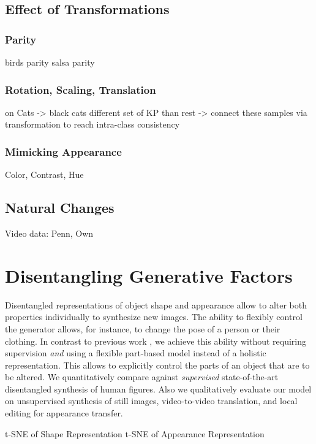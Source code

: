 	\subsection{Effect of Transformations}
		\subsubsection{Parity}
		birds parity
		salsa parity
		\subsubsection{Rotation, Scaling, Translation}
			on Cats -> black cats different set of KP than rest -> connect these samples via transformation to reach intra-class consistency
		\subsubsection{Mimicking Appearance}
		Color, Contrast, Hue
		\subsection{Natural Changes}
		Video data: Penn, Own
\section{Disentangling Generative Factors}
	Disentangled representations of object shape and appearance allow to alter both properties individually to synthesize new images. The ability to flexibly control the generator allows, for instance, to change the pose of a person or their clothing. In contrast to previous work \cite{Esser:2018ue, Denton:2017uf, Ma:2017uu, Ma:2017wq, deBem:2018wp, Jakab:2018wc},
	we achieve this ability without requiring supervision \textit{and} using a flexible part-based model instead of a holistic representation. This allows to explicitly control the parts of an object that are to be altered. We quantitatively compare against \emph{supervised} state-of-the-art disentangled synthesis of human figures. Also we qualitatively evaluate our model on unsupervised synthesis of still images, video-to-video translation, and local editing for appearance transfer.


	t-SNE of Shape Representation
	t-SNE of Appearance Representation
